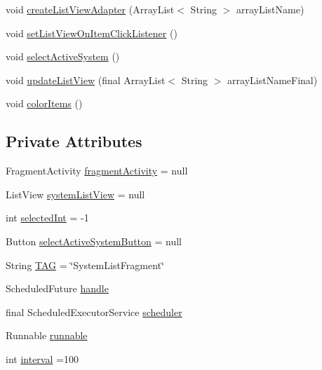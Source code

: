\begin{DoxyCompactItemize}
\item 
void \hyperlink{classpt_1_1lsts_1_1asa_1_1fragments_1_1SystemListFragment_aab652dd19f9e7d8b3ea5b693417f5311}{create\+List\+View\+Adapter} (Array\+List$<$ String $>$ array\+List\+Name)
\item 
void \hyperlink{classpt_1_1lsts_1_1asa_1_1fragments_1_1SystemListFragment_aafbd2cf250bdf07a51ce4c10273cba27}{set\+List\+View\+On\+Item\+Click\+Listener} ()
\item 
void \hyperlink{classpt_1_1lsts_1_1asa_1_1fragments_1_1SystemListFragment_ad72566b38e912e9ca914cbcde54a484a}{select\+Active\+System} ()
\item 
void \hyperlink{classpt_1_1lsts_1_1asa_1_1fragments_1_1SystemListFragment_a4ae44f67f1be900b9f426494fe963c7a}{update\+List\+View} (final Array\+List$<$ String $>$ array\+List\+Name\+Final)
\item 
void \hyperlink{classpt_1_1lsts_1_1asa_1_1fragments_1_1SystemListFragment_a579532fd19607eadf12affb884616362}{color\+Items} ()
\end{DoxyCompactItemize}
\subsection*{Private Attributes}
\begin{DoxyCompactItemize}
\item 
Fragment\+Activity \hyperlink{classpt_1_1lsts_1_1asa_1_1fragments_1_1SystemListFragment_aac7b772fe4d6f717eac3d51d0ea59a63}{fragment\+Activity} = null
\item 
List\+View \hyperlink{classpt_1_1lsts_1_1asa_1_1fragments_1_1SystemListFragment_a30aa8b6899bb6b1e24349d5cbc93ee98}{system\+List\+View} = null
\item 
int \hyperlink{classpt_1_1lsts_1_1asa_1_1fragments_1_1SystemListFragment_ab3759533393b5cc748d55bd4f77d456a}{selected\+Int} = -\/1
\item 
Button \hyperlink{classpt_1_1lsts_1_1asa_1_1fragments_1_1SystemListFragment_a173670a84f396edae24f52fa9919f765}{select\+Active\+System\+Button} = null
\item 
String \hyperlink{classpt_1_1lsts_1_1asa_1_1fragments_1_1SystemListFragment_aa32f4be3e58e7efc53b8ea0fff594403}{T\+A\+G} = \char`\"{}System\+List\+Fragment\char`\"{}
\item 
Scheduled\+Future \hyperlink{classpt_1_1lsts_1_1asa_1_1fragments_1_1SystemListFragment_a9e029280f5b4d3f021759c3f04e24c5d}{handle}
\item 
final Scheduled\+Executor\+Service \hyperlink{classpt_1_1lsts_1_1asa_1_1fragments_1_1SystemListFragment_a5218e0d7f19f158c3e6e2a89dfd91e37}{scheduler}
\item 
Runnable \hyperlink{classpt_1_1lsts_1_1asa_1_1fragments_1_1SystemListFragment_a9d8989458c81cdb6db38b4f5bc0c96fb}{runnable}
\item 
int \hyperlink{classpt_1_1lsts_1_1asa_1_1fragments_1_1SystemListFragment_a0e16295942ad809a73c61d9ed9cd7684}{interval} =100
\end{DoxyCompactItemize}


